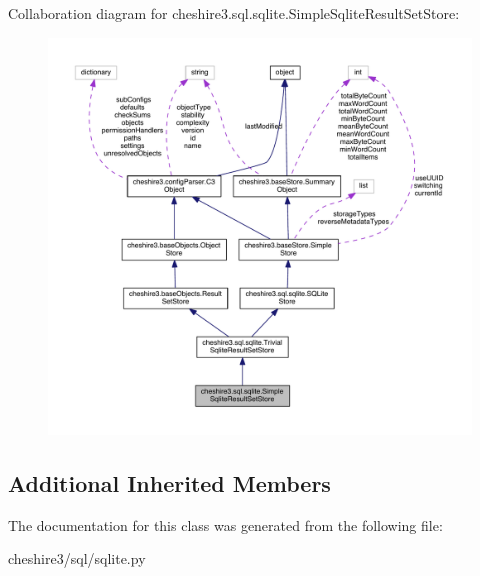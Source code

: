 Collaboration diagram for cheshire3.\-sql.\-sqlite.\-Simple\-Sqlite\-Result\-Set\-Store\-:
\nopagebreak
\begin{figure}[H]
\begin{center}
\leavevmode
\includegraphics[width=350pt]{classcheshire3_1_1sql_1_1sqlite_1_1_simple_sqlite_result_set_store__coll__graph}
\end{center}
\end{figure}
\subsection*{Additional Inherited Members}


The documentation for this class was generated from the following file\-:\begin{DoxyCompactItemize}
\item 
cheshire3/sql/sqlite.\-py\end{DoxyCompactItemize}
